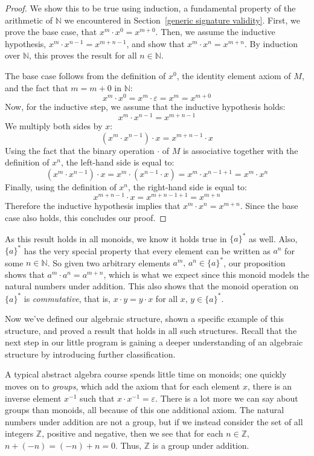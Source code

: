 \documentclass[../generics]{subfiles}
\begin{document}
\begin{proof}
We show this to be true using induction, a fundamental property of the arithmetic of $\mathbb{N}$ we encountered in Section~\ref{generic signature validity}. First, we prove the base case, that $x^m\cdot x^0=x^{m+0}$. Then, we assume the inductive hypothesis, $x^m\cdot x^{n-1}=x^{m+n-1}$, and show that $x^m\cdot x^n=x^{m+n}$. By induction over $\mathbb{N}$, this proves the result for all $n\in\mathbb{N}$.

The base case follows from the definition of $x^0$, the identity element axiom of $M$, and the fact that $m=m+0$ in $\mathbb{N}$:
\[x^m\cdot x^0=x^m\cdot\varepsilon=x^m=x^{m+0}\]
Now, for the inductive step, we assume that the inductive hypothesis holds:
\[x^m\cdot x^{n-1}=x^{m+n-1}\]
We multiply both sides by $x$:
\[(x^m\cdot x^{n-1})\cdot x =x^{m+n-1}\cdot x\]
Using the fact that the binary operation $\cdot$ of $M$ is associative together with the definition of $x^n$, the left-hand side is equal to:
\[
(x^m\cdot x^{n-1})\cdot x = x^m\cdot (x^{n-1}\cdot x) = x^m\cdot x^{n-1+1}=x^m\cdot x^n
\]
Finally, using the definition of $x^n$, the right-hand side is equal to:
\[
x^{m+n-1}\cdot x = x^{m+n-1+1}=x^{m+n}
\]
Therefore the inductive hypothesis implies that $x^m\cdot x^n=x^{m+n}$. Since the base case also holds, this concludes our proof.
\end{proof}
As this result holds in all monoids, we know it holds true in $\{a\}^*$ as well. Also, $\{a\}^*$ has the very special property that every element can be written as $a^n$ for some $n\in\mathbb{N}$. So given two arbitrary elements $a^m,\,a^n\in \{a\}^*$, our proposition shows that $a^m\cdot a^n=a^{m+n}$, which is what we expect since this monoid models the natural numbers under addition. This also shows that the monoid operation on $\{a\}^*$ is \emph{commutative}, that is, $x\cdot y=y\cdot x$ for all $x,\,y\in\{a\}^*$.

\medskip
Now we've defined our algebraic structure, shown a specific example of this structure, and proved a result that holds in all such structures. Recall that the next step in our little program is gaining a deeper understanding of an algebraic structure by introducing further classification.

A typical abstract algebra course spends little time on monoids; one quickly moves on to \emph{groups}, which add the axiom that for each element $x$, there is an inverse element $x^{-1}$ such that $x\cdot x^{-1}=\varepsilon$. There is a lot more we can say about groups than monoids, all because of this one additional axiom. The natural numbers under addition are not a group, but if we instead consider the set of all integers $\mathbb{Z}$, positive and negative, then we see that for each $n\in\mathbb{Z}$, $n+(-n)=(-n)+n=0$. Thus, $\mathbb{Z}$ is a group under addition.
\end{document}
